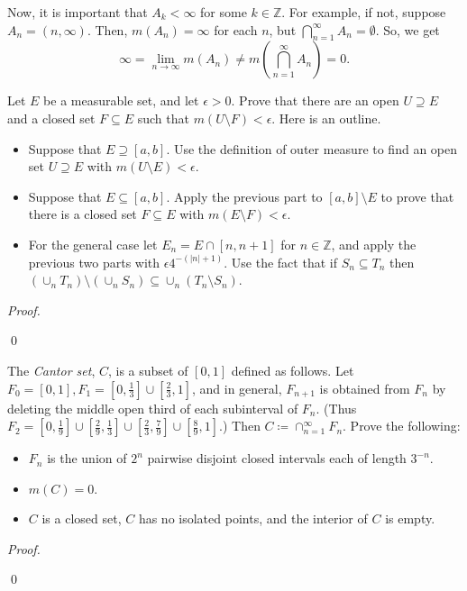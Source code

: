 \documentclass[12pt]{article}
\newenvironment{problem}[2][Problem]{\begin{trivlist}
\item[\hskip \labelsep {\bfseries #1}\hskip \labelsep {\bfseries
#2.}]}{\end{trivlist}}
\newenvironment{sol}
    {\emph{Proof.}
    }
    {
    \qed
    }
\begin{document}
  Now, it is important that $A_k < \infty$ for some $k \in \mathbb{Z}$. For example, if not, suppose $A_n = (n,\infty)$. Then, $m(A_n) = \infty$ for each $n$, but $\bigcap_{n = 1}^{\infty}A_n = \emptyset$. So, we get $$\infty = \lim_{n \to \infty} m(A_n) \neq m(\bigcap_{n = 1}^{\infty}A_n) = 0.$$
  
  \begin{problem}{39}
    Let $E$ be a measurable set, and let $\epsilon > 0$. Prove that there are an open $U \supseteq E$ and a closed set $F \subseteq E$ such that $m(U \setminus F) < \epsilon$. Here is an outline.
  
    \begin{itemize}
      \item[(a)] Suppose that $E \supseteq [a,b]$. Use the definition of outer measure to find an open set $U \supseteq E$ with $m(U \setminus E) < \epsilon$.
      \item[(b)] Suppose that $E \subseteq [a,b]$. Apply the previous part to $[a,b] \setminus E$ to prove that there is a closed set $F \subseteq E$ with $m(E \setminus F) < \epsilon$.
      \item[(c)] For the general case let $E_n = E \cap [n,n+1]$ for $n \in \mathbb{Z}$, and apply the previous two parts with $\epsilon4^{-(|n|+1)}$. Use the fact that if $S_n \subseteq T_n$ then $(\cup_nT_n) \setminus (\cup_nS_n) \subseteq \cup_n(T_n \setminus S_n)$.
    \end{itemize}
  \end{problem}
  \begin{sol}
    
  \end{sol}
  
  \begin{problem}{40}
    The \textit{Cantor set}, $C$, is a subset of $[0,1]$ defined as follows. Let $F_0 = [0,1], F_1 = [0,\frac{1}{3}]\cup[\frac{2}{3},1]$, and in general, $F_{n+1}$ is obtained from $F_n$ by deleting the middle open third of each subinterval of $F_n$. (Thus $F_2 = [0,\frac{1}{9}]\cup[\frac{2}{9},\frac{1}{3}]\cup[\frac{2}{3},\frac{7}{9}]\cup[\frac{8}{9},1]$.) Then $C \coloneqq \cap_{n = 1}^{\infty}F_n$. Prove the following:
    \begin{itemize}
      \item[(a)] $F_n$ is the union of $2^n$ pairwise disjoint closed intervals each of length $3^{-n}$.
      \item[(b)] $m(C) = 0$.
      \item[(c)] $C$ is a closed set, $C$ has no isolated points, and the interior of $C$ is empty.  
    \end{itemize}
  \end{problem}
  \begin{sol}
    
  \end{sol}
\end{document}
